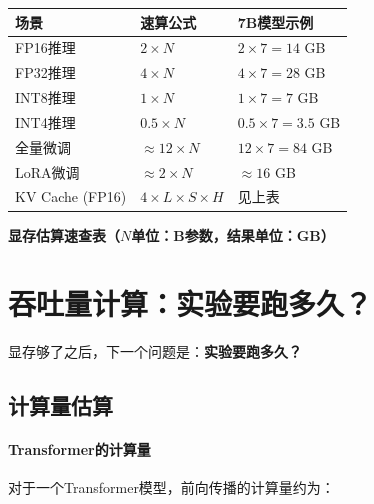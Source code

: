 \begin{center}

\small
\renewcommand{\arraystretch}{1.4}
\begin{tabular}{l|l|l}
\toprule
\textbf{场景} & \textbf{速算公式} & \textbf{7B模型示例} \\
\midrule
FP16推理 & $2 \times N$ & $2 \times 7 = 14$ GB \\
FP32推理 & $4 \times N$ & $4 \times 7 = 28$ GB \\
INT8推理 & $1 \times N$ & $1 \times 7 = 7$ GB \\
INT4推理 & $0.5 \times N$ & $0.5 \times 7 = 3.5$ GB \\
\midrule
全量微调 & $\approx 12 \times N$ & $12 \times 7 = 84$ GB \\
LoRA微调 & $\approx 2 \times N$ & $\approx 16$ GB \\
\midrule
KV Cache (FP16) & $4 \times L \times S \times H$ & 见上表 \\
\bottomrule
\end{tabular}
\par\medskip\noindent\textbf{显存估算速查表（$N$单位：B参数，结果单位：GB）}\par
\end{center}

\section*{吞吐量计算：实验要跑多久？}

显存够了之后，下一个问题是：\textbf{实验要跑多久？}

\subsection*{计算量估算}

\paragraph{Transformer的计算量}

对于一个Transformer模型，前向传播的计算量约为：

